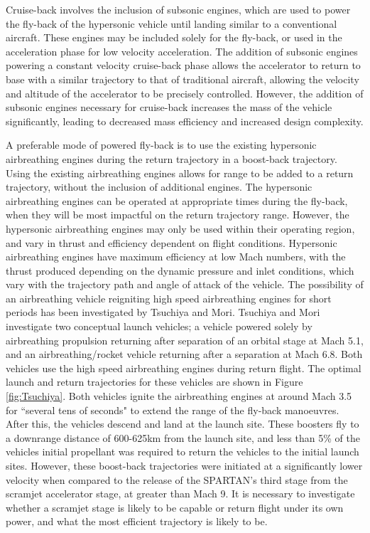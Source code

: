 Cruise-back involves the inclusion of subsonic engines, which are used to power the fly-back of the hypersonic vehicle until landing similar to a conventional aircraft. These engines may be included solely for the fly-back\cite{Hellman}, or used in the acceleration phase for low velocity acceleration\cite{Mehta2001,Tetlow1992,Wilhite1991}. The addition of subsonic engines powering a constant velocity cruise-back phase allows the accelerator to return to base with a similar trajectory to that of traditional aircraft, allowing the velocity and altitude of the accelerator to be precisely controlled. However, the addition of subsonic engines necessary for cruise-back increases the mass of the vehicle significantly, leading to decreased mass efficiency and increased design complexity\cite{Hellman}. 

A preferable mode of powered fly-back is to use the existing hypersonic airbreathing engines during the return trajectory in a boost-back trajectory. Using the existing airbreathing engines allows for range to be added to a return trajectory, without the inclusion of additional engines. The hypersonic airbreathing engines can be operated at appropriate times during the fly-back, when they will be most impactful on the return trajectory range. However, the hypersonic airbreathing engines may only be used within their operating region, and vary in thrust and efficiency dependent on flight conditions. Hypersonic airbreathing engines have maximum efficiency at low Mach numbers\cite{Preller2017b}, with the thrust produced depending on the dynamic pressure and inlet conditions, which vary with the trajectory path and angle of attack of the vehicle. 
The possibility of an airbreathing vehicle reigniting high speed airbreathing engines for short periods has been investigated by Tsuchiya and Mori\cite{Tsuchiya2005}.  Tsuchiya and Mori investigate two conceptual launch vehicles; a vehicle powered solely by airbreathing propulsion returning after separation of an orbital stage at Mach 5.1, and an airbreathing/rocket vehicle returning after a separation at Mach 6.8\cite{Tsuchiya2005}.  Both vehicles use the high speed airbreathing engines during return flight. The optimal launch and return trajectories for these vehicles are shown in Figure \ref{fig:Tsuchiya}. Both vehicles ignite the airbreathing engines at around Mach 3.5 for ``several tens of seconds" to extend the range of the fly-back manoeuvres. After this, the vehicles descend and land at the launch site. 
These boosters fly to a downrange distance of 600-625km from the launch site, and less than 5\% of the vehicles initial propellant was required to return the vehicles to the initial launch sites\cite{Tsuchiya2005}. However, these boost-back trajectories were initiated at a significantly lower velocity when compared to the release of the SPARTAN's third stage from the scramjet accelerator stage, at greater than Mach 9. It is necessary to investigate whether a scramjet stage is likely to be capable or return flight under its own power, and what the most efficient trajectory is likely to be. 
